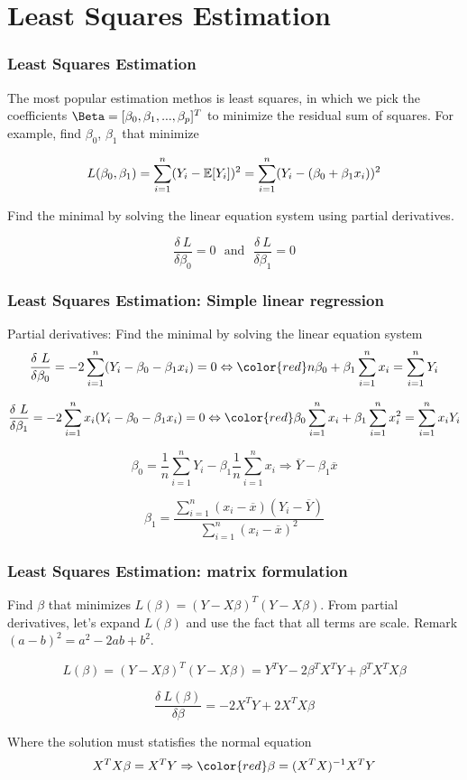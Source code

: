 


\section{Least Squares Estimation}
\begin{frame}
    \frametitle{Least Squares Estimation}

    The most popular estimation methos is least squares, in which we pick
    the coefficients $\Beta = [\beta_0, \beta_1, ..., \beta_p]^T$ to minimize the
    residual sum of squares. For example, find $\beta_0$, $\beta_1$ that minimize

    $$L(\beta_0,\beta_1) = \sum_{i=1}^{n}(Y_i - \operatorname*{\mathbb{E}}[Y_i])^2 = \sum_{i=1}^{n}(Y_i - (\beta_0+\beta_1x_i))^2$$


    Find the minimal by solving the linear equation system using partial derivatives.

    $$\frac{\delta~L}{\delta\beta_0} = 0~~~\text{and}~~~\frac{\delta~L}{\delta\beta_1} = 0$$

\end{frame}



\begin{frame}
    \frametitle{Least Squares Estimation: Simple linear regression}

    Partial derivatives: Find the minimal by solving the linear equation system
    \small
    $$\frac{\delta~L}{\delta\beta_0} = -2\sum_{i=1}^{n}(Y_i-\beta_0-\beta_1x_i) = 0 
    \Leftrightarrow {\color{red}n\beta_0+\beta_1\sum_{i=1}^{n}x_i=\sum_{i=1}^{n}Y_i}$$

    \small
    $$\frac{\delta~L}{\delta\beta_1} = -2\sum_{i=1}^{n}x_i(Y_i-\beta_0-\beta_1x_i) = 0 
    \Leftrightarrow {\color{red}\beta_0\sum_{i=1}^{n}x_i+\beta_1\sum_{i=1}^{n}x_i^2=\sum_{i=1}^{n}x_{i}Y_i}$$

    $$\beta_0 = \frac{1}{n}\sum_{i=1}^{n}Y_i - \beta_1\frac{1}{n}\sum_{i=1}^{n}x_i\Rightarrow \overline{Y}-\beta_1\overline{x}$$
    
    $$\beta_1 = \frac{\sum_{i=1}^{n}(x_i - \overline{x})(Y_i - \overline{Y})}{\sum_{i=1}^{n}(x_i-\overline{x})^2}$$

\end{frame}



\begin{frame}
    \frametitle{Least Squares Estimation: matrix formulation}

    Find $\beta$ that minimizes $L(\beta) = (Y-X\beta)^T(Y-X\beta)$.
    From partial derivatives, let's expand $L(\beta)$ and use the fact that all terms
    are scale. Remark $(a-b)^2=a^2-2ab+b^2$.

    $$L(\beta) = (Y-X\beta)^T(Y-X\beta) = Y^TY - 2\beta^TX^TY + \beta^TX^TX\beta$$

    $$\frac{\delta~L(\beta)}{\delta\beta} = -2X^TY + 2X^TX\beta$$

    Where the solution must statisfies the normal equation 
    $$X^TX\beta = X^TY \Rightarrow {\color{red}\beta = (X^TX)^{-1}X^TY}$$
\end{frame}


